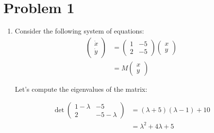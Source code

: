 \documentclass[12pt,letterpaper]{article}
\begin{document}
\section*{Problem 1}

\begin{enumerate}[label=(\alph*)]
	\item
	      Consider the following system of equations:
	      \begin{align}
		      \begin{pmatrix}
			      \dot{x} \\
			      \dot{y}
		      \end{pmatrix} & =
		      \begin{pmatrix}
			      1 & -5 \\
			      2 & -5
		      \end{pmatrix} \begin{pmatrix}
			      x \\
			      y
		      \end{pmatrix} \\ \label{eq:init_1}
		                                & =
		      M \begin{pmatrix}
			      x \\
			      y
		      \end{pmatrix}\end{align}

	      Let's compute the eigenvalues of the matrix:

	      \begin{align}
		      \det \begin{pmatrix}
			      1 - \lambda & -5           \\
			      2           & -5 - \lambda
		      \end{pmatrix} & = (\lambda + 5)(\lambda - 1) + 10               \\
		                                     & = \lambda ^ 2 + 4 \lambda + 5 \label{eq:char_1}
	      \end{align}


\end{enumerate}
\end{document}
